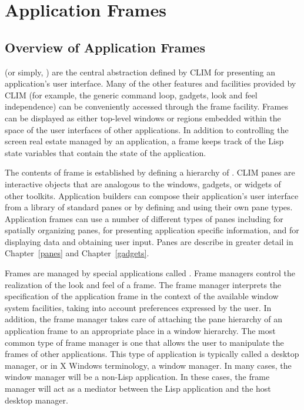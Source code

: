 
\chapter {Application Frames}
\label {application-frames}

\section {Overview of Application Frames}

 (or simply, ) are the central
abstraction defined by CLIM for presenting an application's user interface.
Many of the other features and facilities provided by CLIM (for example, the
generic command loop, gadgets, look and feel independence) can be conveniently
accessed through the frame facility.  Frames can be displayed as either
top-level windows or regions embedded within the space of the user interfaces of
other applications.  In addition to controlling the screen real estate managed
by an application, a frame keeps track of the Lisp state variables that contain
the state of the application.

The contents of frame is established by defining a hierarchy of .
CLIM panes are interactive objects that are analogous to the windows, gadgets,
or widgets of other toolkits.  Application builders can compose their
application's user interface from a library of standard panes or by defining and
using their own pane types.  Application frames can use a number of different
types of panes including  for spatially organizing panes,
 for presenting application specific information, and
 for displaying data and obtaining user input.  Panes are
describe in greater detail in Chapter~\ref{panes} and Chapter~\ref{gadgets}.

Frames are managed by special applications called .
Frame managers control the realization of the look and feel of a frame.  The
frame manager interprets the specification of the application frame in the
context of the available window system facilities, taking into account
preferences expressed by the user.  In addition, the frame manager takes care of
attaching the pane hierarchy of an application frame to an appropriate place in
a window hierarchy.  The most common type of frame manager is one that allows
the user to manipulate the frames of other applications.  This type of
application is typically called a desktop manager, or in X Windows terminology,
a window manager.  In many cases, the window manager will be a non-Lisp
application.  In these cases, the frame manager will act as a mediator between
the Lisp application and the host desktop manager.

